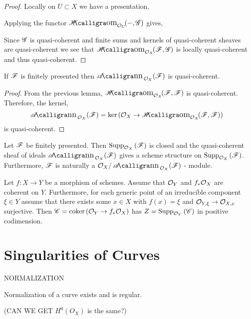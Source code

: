 \documentclass[12pt]{article}
\begin{document}
\begin{proof}
Locally on $U \subset X$ we have a presentation,
\begin{center}
\end{center}
Applying the functor $\shHom{\struct{U}}{-}{\G}$ gives,
\begin{center}
\end{center}
Since $\mathscr{G}$ is quasi-coherent and finite sums and kernels of quasi-coherent sheaves are quasi-coherent we see that $\shHom{\struct{X}}{\F}{\G}$ is locally quasi-coherent and thus quasi-coherent.
\end{proof}

\begin{lemma}
If $\mathscr{F}$ is finitely presented then $\shAnn{\struct{X}}{\F}$ is quasi-coherent.
\end{lemma}

\begin{proof}
From the previous lemma, $\shHom{\struct{X}}{\F}{\F}$ is quasi-coherent. Therefore, the kernel,
\[ \shAnn{\struct{X}}{\F} = \ker{(\struct{X} \to \shHom{\struct{X}}{\F}{\F})} \]
is quasi-coherent.
\end{proof}

\begin{prop}
Let $\mathscr{F}$ be finitely presented. Then $\mathrm{Supp}_{\mathcal{O}_{X}}\left(\mathscr{F} \right)$ is closed and the quasi-coherent sheaf of ideals $\shAnn{\struct{X}}{\F}$ gives a scheme structure on $\mathrm{Supp}_{\mathcal{O}_{X}}\left(\mathscr{F} \right)$. Furthermore, $\mathscr{F}$ is naturally a $\struct{X} / \shAnn{\struct{X}}{\F}$ - module.
\end{prop}

\begin{lemma}
Let $f : X \to Y$ be a morphism of schemes. Assume that $\mathcal{O}_{Y}$ and $f_* \mathcal{O}_{X}$ are coherent on $Y$. Furthermore, for each generic point of an irreducible component $\xi \in Y$ assume that there exists some $x \in X$ with $f(x) = \xi$ and $\mathcal{O}_{Y, \xi} \to \mathcal{O}_{X, x}$ surjective. Then $\mathscr{C} = \operatorname{\mathrm{coker}}{(\mathcal{O}_{Y} \to f_* \mathcal{O}_{X})}$ has $Z = \mathrm{Supp}_{\mathcal{O}_{Y}}\left(\mathscr{C} \right)$ in positive codimension.
\end{lemma}




\section{Singularities of Curves}


\begin{defn}
NORMALIZATION
\end{defn}

\begin{prop}
Normalization of a curve exists and is regular. 
\end{prop}

(CAN WE GET $H^0(O_X)$ is the same?)
\end{document}
